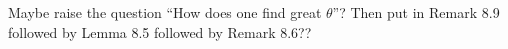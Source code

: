 \documentclass[12pt]{amsart}
\begin{document}

{\red Maybe raise the question ``How does one find great $\theta$''? Then put in Remark 8.9 followed by Lemma 8.5 followed by Remark 8.6??}



\end{document}
